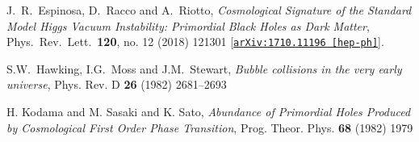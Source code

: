 \documentclass{PoS}
\begin{document}
\begin{thebibliography}{99}
  J.~R.~Espinosa, D.~Racco and A.~Riotto,
  {\it Cosmological Signature of the Standard Model Higgs Vacuum Instability: Primordial Black Holes as Dark Matter},
  Phys.\ Rev.\ Lett.\  {\bf 120}, no. 12  (2018) 121301
  [\href{http://arxiv.org/abs/arXiv:1710.11196}{{\tt arXiv:1710.11196 [hep-ph]}}].



S.W.~Hawking, I.G.~Moss  and J.M.~Stewart,
{\it Bubble collisions in the very early universe},
Phys. Rev. D {\bf 26} (1982) 2681--2693

H. Kodama and M. Sasaki and K. Sato,
{\it Abundance of Primordial Holes Produced by Cosmological First Order Phase Transition},
Prog. Theor. Phys. {\bf 68} (1982) 1979



\end{thebibliography}
\end{document}
